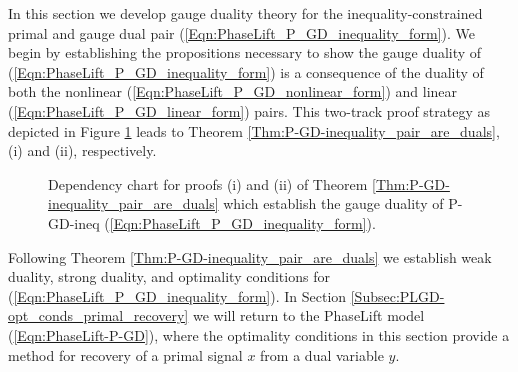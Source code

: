 In this section we develop gauge duality theory for the inequality-constrained primal and gauge dual pair (\ref{Eqn:PhaseLift_P_GD_inequality_form}).  
We begin by establishing the propositions necessary to show the gauge duality of (\ref{Eqn:PhaseLift_P_GD_inequality_form}) is a consequence of the duality of both the nonlinear (\ref{Eqn:PhaseLift_P_GD_nonlinear_form}) and linear (\ref{Eqn:PhaseLift_P_GD_linear_form}) pairs.  
This two-track proof strategy as depicted in Figure \ref{Fig:gauge_duality_thm_flowchart} leads to Theorem \ref{Thm:P-GD-inequality_pair_are_duals}, (i) and (ii), respectively.
\begin{figure}[H] 
\centering
\hspace{0cm}
\hspace{1cm}
\caption{Dependency chart for proofs (i) and (ii) of Theorem \ref{Thm:P-GD-inequality_pair_are_duals} which establish the gauge duality of P-GD-ineq (\ref{Eqn:PhaseLift_P_GD_inequality_form}).
  	}
\label{Fig:gauge_duality_thm_flowchart}
\end{figure}

Following Theorem \ref{Thm:P-GD-inequality_pair_are_duals} we establish weak duality, strong duality, and optimality conditions for (\ref{Eqn:PhaseLift_P_GD_inequality_form}).  In Section \ref{Subsec:PLGD-opt_conds_primal_recovery} we will return to the PhaseLift model (\ref{Eqn:PhaseLift-P-GD}), where the optimality conditions in this section provide a method for recovery of a primal signal $x$ from a dual variable $y$.


